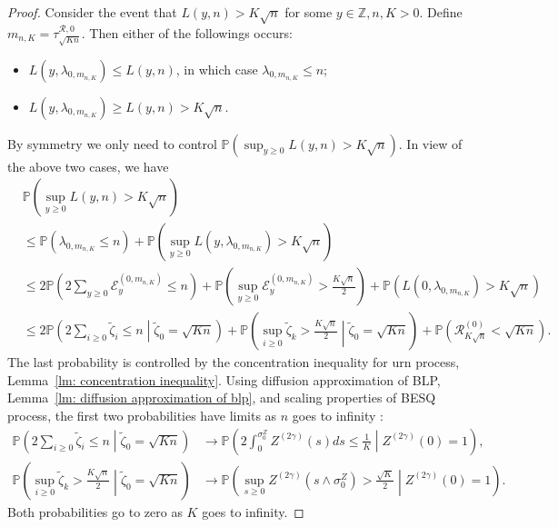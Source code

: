 \documentclass[EJP]{ejpecp} %
\begin{document}
\begin{proof}
	Consider the event that $L(y, n) > K \sqrt{n} $ for some $y \in \mathbb{Z}, n, K > 0$. Define $m_{n, K } = \tau^{\mathscr{R}, 0}_{\sqrt{K n} }$. Then either of the followings occurs:
	\begin{itemize}
		\item $L(y, \lambda_{0, m_{n, K}}) \le L(y, n)$, in which case $\lambda_{0, m_{n, K}} \le  n$;
		\item $L(y, \lambda_{0, m_{n, K}}) \ge  L(y, n)  > K \sqrt{n} $.
	\end{itemize}
	By symmetry we only need to control $\mathbb{P}\left( \sup _{y \ge  0} L(y, n) > K \sqrt{n}  \right) $. In view of the above two cases, we have
	\begin{align*}
		&\mathbb{P}\left( \sup _{y \ge  0} L(y, n) > K \sqrt{n}  \right) \\
		&\le \mathbb{P}\left( \lambda_{0, m_{n, K}} \le n \right) + \mathbb{P}\left( \sup _{y \ge 0} L\left( y, \lambda_{0, m_{n, K}}\right)   > K \sqrt{n}  \right)  \\
		&\le 2\mathbb{P}\left( 2 \sum_{y \ge 0} \mathcal{E}_y^{(0,m_{n, K})} \le n \right) + \mathbb{P}\left( \sup _{y \ge 0} \mathcal{E}_y^{\left( 0,m_{n, K} \right) }   > \frac{K \sqrt{n} }{2}  \right)+ \mathbb{P}\left( L(0,\lambda_{0, m_{n, K}}) > K \sqrt{n}  \right)  \\
		&\le 
		2\mathbb{P}\left( 2 \sum_{i \ge  0} \tilde \zeta_i \le  n \middle| \tilde\zeta_0 = \sqrt{K n} \right) + 
		\mathbb{P}\left( \sup _{i \ge 0} \tilde \zeta_k > \frac{K \sqrt{n} }{2} \middle| \tilde \zeta_0 = \sqrt{K n}   \right)+ 
		\mathbb{P}\left( \mathscr{R}^{(0)} _{K \sqrt{n} } < \sqrt{K n}  \right) 
		.\end{align*}
	The last probability is controlled by the concentration inequality for urn process, Lemma~\ref{lm: concentration inequality}. Using diffusion approximation of BLP, Lemma~\ref{lm: diffusion approximation of blp}, and scaling properties of BESQ process, the first two probabilities have limits as $n$ goes to infinity :
	\begin{align*}
		\mathbb{P}\left( 2 \sum_{i \ge  0} \tilde \zeta_i \le  n \middle| \tilde\zeta_0 = \sqrt{K n} \right) 
		&\to 
		\mathbb{P}\left(2 \int _0^{\sigma_0^{Z}} Z^{(2 \gamma)}(s) d s \le \frac{1}{K} \middle| Z^{(2 \gamma)}(0) = 1 \right),\\
		\mathbb{P}\left( \sup _{i \ge 0} \tilde \zeta_k > \frac{K \sqrt{n} }{2} \middle| \tilde \zeta_0 = \sqrt{K n}   \right)
		&\to 
		\mathbb{P}\left( \sup_{s \ge 0} Z^{(2 \gamma)}(s \wedge \sigma_0^{Z}) > \frac{\sqrt{K} }{2} \middle| Z^{(2 \gamma)} (0) = 1 \right) 
		.\end{align*} 
	Both probabilities go to zero as $K$ goes to infinity. 
\end{proof}
\end{document}
